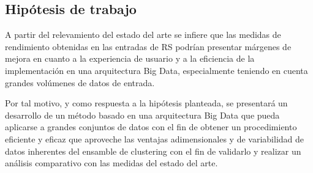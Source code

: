 \subsection{Hipótesis de trabajo}
\noindent A partir del relevamiento del estado del arte se infiere que las medidas de rendimiento obtenidas en las entradas de RS podrían presentar márgenes de mejora en cuanto a la experiencia de usuario y a la eficiencia de la implementación en una arquitectura Big Data, especialmente teniendo en cuenta grandes volúmenes de datos de entrada.

\bigskip Por tal motivo, y como respuesta a la hipótesis planteada, se presentará un desarrollo de un método basado en una arquitectura Big Data que pueda aplicarse a grandes conjuntos de datos con el fin de obtener un procedimiento eficiente y eficaz que aproveche las ventajas adimensionales y de variabilidad de datos inherentes del ensamble de clustering con el fin de validarlo y realizar un análisis comparativo con las medidas del estado del arte.
